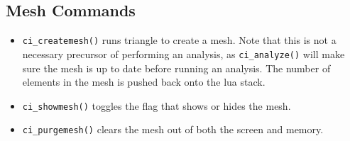 \subsection{Mesh Commands}

\begin{itemize}
\item \texttt{ci\_createmesh()} runs triangle to create a mesh. Note that this is not
a necessary precursor of performing an analysis, as
\texttt{ci\_analyze()} will make sure the mesh is up to date before
running an analysis. The number of elements in the mesh is pushed
back onto the lua stack.

\item \texttt{ci\_showmesh()} toggles the flag that shows or hides the mesh.

\item \texttt{ci\_purgemesh()} clears the mesh out of both the screen and memory.
\end{itemize}

